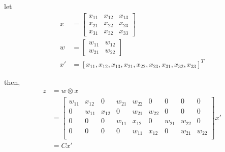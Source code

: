 \documentclass{subfiles}
\begin{document}
let
\begin{align*}
x
& = \left[
    \begin{array}{ccc}
        x_{11} & x_{12} & x_{13} \\
        x_{21} & x_{22} & x_{23} \\
        x_{31} & x_{32} & x_{33}
    \end{array}
\right] \\
w
& = \left[
    \begin{array}{cc}
        w_{11} & w_{12} \\
        w_{21} & w_{22}
    \end{array}
\right] \\
x' 
& = [x_{11}, x_{12}, x_{13},
     x_{21}, x_{22}, x_{23},
     x_{31}, x_{32}, x_{33}]^T
\end{align*}

then,
\begin{align*}
z
& = w \otimes x \\
& = \left[
    \begin{array}{ccccccccc}
        w_{11} & x_{12} & 0 & w_{21} & w_{22} & 0 & 0 & 0 & 0 \\
        0 & w_{11} & x_{12} & 0 & w_{21} & w_{22} & 0 & 0 & 0 \\
        0 & 0 & 0 & w_{11} & x_{12} & 0 & w_{21} & w_{22} & 0 \\
        0 & 0 & 0 & 0 & w_{11} & x_{12} & 0 & w_{21} & w_{22} \\
    \end{array}
\right] x' \\
& = C x'
\end{align*}
\end{document}
